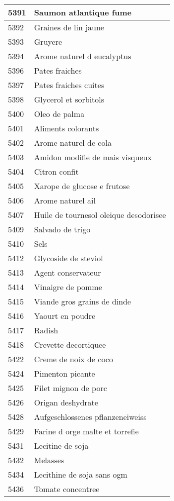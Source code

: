 \begin{longtable}{|l|l|}
5391 & Saumon atlantique fume \\ \hline 
5392 & Graines de lin jaune \\ \hline 
5393 & Gruyere \\ \hline 
5394 & Arome naturel d eucalyptus \\ \hline 
5396 & Pates fraiches \\ \hline 
5397 & Pates fraiches cuites \\ \hline 
5398 & Glycerol et sorbitols \\ \hline 
5400 & Oleo de palma \\ \hline 
5401 & Aliments colorants \\ \hline 
5402 & Arome naturel de cola \\ \hline 
5403 & Amidon modifie de mais visqueux \\ \hline 
5404 & Citron confit \\ \hline 
5405 & Xarope de glucose e frutose \\ \hline 
5406 & Arome naturel ail \\ \hline 
5407 & Huile de tournesol oleique desodorisee \\ \hline 
5409 & Salvado de trigo \\ \hline 
5410 & Sels \\ \hline 
5412 & Glycoside de steviol \\ \hline 
5413 & Agent conservateur \\ \hline 
5414 & Vinaigre de pomme \\ \hline 
5415 & Viande gros grains de dinde \\ \hline 
5416 & Yaourt en poudre \\ \hline 
5417 & Radish \\ \hline 
5418 & Crevette decortiquee \\ \hline 
5422 & Creme de noix de coco \\ \hline 
5424 & Pimenton picante \\ \hline 
5425 & Filet mignon de porc \\ \hline 
5426 & Origan deshydrate \\ \hline 
5428 & Aufgeschlossenes pflanzeneiweiss \\ \hline 
5429 & Farine d orge malte et torrefie \\ \hline 
5431 & Lecitine de soja \\ \hline 
5432 & Melasses \\ \hline 
5434 & Lecithine de soja sans ogm \\ \hline 
5436 & Tomate concentree \\ \hline 

\end{longtable}
